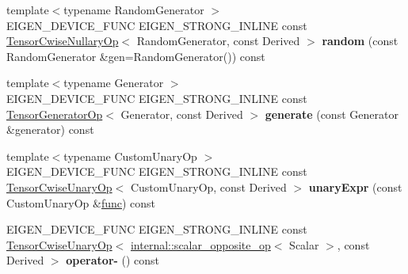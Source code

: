 \begin{DoxyCompactItemize}
{\footnotesize template$<$typename Random\+Generator $>$ }\\E\+I\+G\+E\+N\+\_\+\+D\+E\+V\+I\+C\+E\+\_\+\+F\+U\+NC E\+I\+G\+E\+N\+\_\+\+S\+T\+R\+O\+N\+G\+\_\+\+I\+N\+L\+I\+NE const \hyperlink{class_eigen_1_1_tensor_cwise_nullary_op}{Tensor\+Cwise\+Nullary\+Op}$<$ Random\+Generator, const Derived $>$ {\bfseries random} (const Random\+Generator \&gen=Random\+Generator()) const
\item 
\mbox{\label{class_eigen_1_1_tensor_base_3_01_derived_00_01_read_only_accessors_01_4_a3c34a78ef543cf60dc7b05a48b7794b7}} 
{\footnotesize template$<$typename Generator $>$ }\\E\+I\+G\+E\+N\+\_\+\+D\+E\+V\+I\+C\+E\+\_\+\+F\+U\+NC E\+I\+G\+E\+N\+\_\+\+S\+T\+R\+O\+N\+G\+\_\+\+I\+N\+L\+I\+NE const \hyperlink{class_eigen_1_1_tensor_generator_op}{Tensor\+Generator\+Op}$<$ Generator, const Derived $>$ {\bfseries generate} (const Generator \&generator) const
\item 
\mbox{\label{class_eigen_1_1_tensor_base_3_01_derived_00_01_read_only_accessors_01_4_a6c0fb6695ba9a6d9400242d2de6bd334}} 
{\footnotesize template$<$typename Custom\+Unary\+Op $>$ }\\E\+I\+G\+E\+N\+\_\+\+D\+E\+V\+I\+C\+E\+\_\+\+F\+U\+NC E\+I\+G\+E\+N\+\_\+\+S\+T\+R\+O\+N\+G\+\_\+\+I\+N\+L\+I\+NE const \hyperlink{class_eigen_1_1_tensor_cwise_unary_op}{Tensor\+Cwise\+Unary\+Op}$<$ Custom\+Unary\+Op, const Derived $>$ {\bfseries unary\+Expr} (const Custom\+Unary\+Op \&\hyperlink{structfunc}{func}) const
\item 
\mbox{\label{class_eigen_1_1_tensor_base_3_01_derived_00_01_read_only_accessors_01_4_a156244eba84cb75e44877297d609bfd0}} 
E\+I\+G\+E\+N\+\_\+\+D\+E\+V\+I\+C\+E\+\_\+\+F\+U\+NC E\+I\+G\+E\+N\+\_\+\+S\+T\+R\+O\+N\+G\+\_\+\+I\+N\+L\+I\+NE const \hyperlink{class_eigen_1_1_tensor_cwise_unary_op}{Tensor\+Cwise\+Unary\+Op}$<$ \hyperlink{struct_eigen_1_1internal_1_1scalar__opposite__op}{internal\+::scalar\+\_\+opposite\+\_\+op}$<$ Scalar $>$, const Derived $>$ {\bfseries operator-\/} () const
\item 
\mbox{\label{class_eigen_1_1_tensor_base_3_01_derived_00_01_read_only_accessors_01_4_a26a99144d3162a4569847519acfc5ab9}} 

\end{DoxyCompactItemize}
